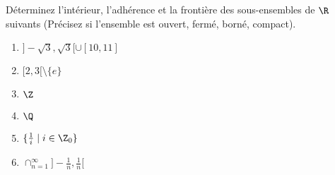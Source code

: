 
\begin{exercice}\label{exo0072}

Déterminez l'intérieur, l'adhérence et la frontière des sous-ensembles de $\R$ suivants (Précisez si l'ensemble est ouvert, fermé, borné, compact).
\begin{enumerate}
\item $ ]  -\sqrt{3}, \sqrt{3} [ \cup [10, 11] $
\item\label{Item72b} $ [ 2, 3[ \setminus \{ e \} $
\item $ \Z $
\item $ \Q $
\item $ \{ \frac{1}{i} \mid i \in \Z_0 \} $
\item\label{ItemF0072} $ \cap_{n = 1}^{ \infty} ] -\frac{1}{n} , \frac{1}{n} [ $
\end{enumerate}

\end{exercice}

